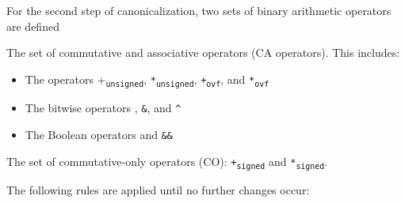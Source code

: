 For the second step of canonicalization, two sets of binary arithmetic
operators are defined

\begin{compactitem}
\item
  The set of commutative and associative operators (CA operators).
  This includes:

  \begin{itemize}
  \item
    The operators +\texttt{\textsubscript{unsigned}},
    \texttt{*\textsubscript{unsigned}}, \texttt{+\textsubscript{ovf}},
    and \texttt{*\textsubscript{ovf}}
  \item
    The bitwise operators \texttt{\textbar{}}, \texttt{\&}, and
    \texttt{\^{}}
  \item
    The Boolean operators \texttt{\textbar{}\textbar{}} and
    \texttt{\&\&}
  \end{itemize}
\item
  The set of commutative-only operators (CO):
  \texttt{+\textsubscript{signed}} and \texttt{*\textsubscript{signed}}.
\end{compactitem}

The following rules are applied until no further changes occur:

